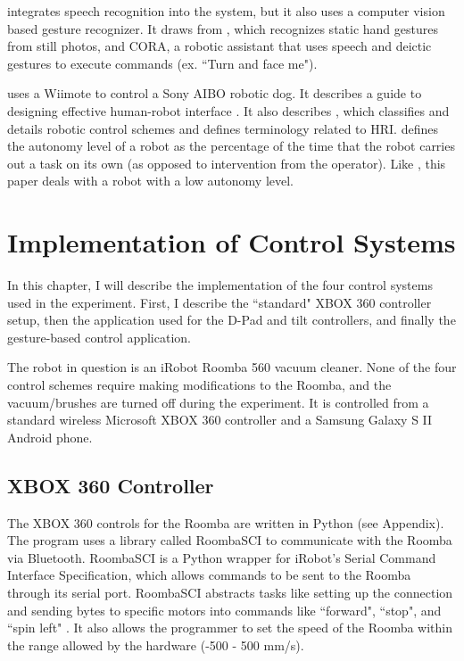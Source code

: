 \documentclass[12pt,a4paper]{report}
\begin{document}
\cite{Rogalla} integrates speech recognition into the system, but it also uses a computer vision based gesture recognizer. It draws from \cite{Kestler}, which recognizes static hand gestures from still photos, and CORA, a robotic assistant that uses speech and deictic gestures to execute commands (ex. ``Turn and face me").

\cite{Guo} uses a Wiimote to control a Sony AIBO robotic dog. It describes a guide to designing effective human-robot interface \cite{GoodrichOlsen}. It also describes \cite{YancoDrury}, which classifies and details robotic control schemes and defines terminology related to HRI. \cite{YancoDrury} defines the autonomy level of a robot as the percentage of the time that the robot carries out a task on its own (as opposed to intervention from the operator). Like \cite{Guo}, this paper deals with a robot with a low autonomy level.

\chapter{Implementation of Control Systems}
In this chapter, I will describe the implementation of the four control systems used in the experiment. First, I describe the ``standard" XBOX 360 controller setup, then the application used for the D-Pad and tilt controllers, and finally the gesture-based control application.

The robot in question is an iRobot Roomba 560 vacuum  cleaner. None of the four control schemes require making modifications to the Roomba, and the vacuum/brushes are turned off during the experiment. It is controlled from a standard wireless Microsoft XBOX 360 controller and a Samsung Galaxy S II Android phone.
\section{XBOX 360 Controller}
The XBOX 360 controls for the Roomba are written in Python (see Appendix). The program uses a library called RoombaSCI to communicate with the Roomba via Bluetooth. RoombaSCI is a Python wrapper for iRobot's Serial Command Interface Specification, which allows commands to be sent to the Roomba through its serial port. RoombaSCI abstracts tasks like setting up the connection and sending bytes to specific motors into commands like ``forward", ``stop", and ``spin left" \cite{RoombaSCI}. It also allows the programmer to set the speed of the Roomba within the range allowed by the hardware (-500 - 500 mm/s). \cite{iRobot}
\end{document}
